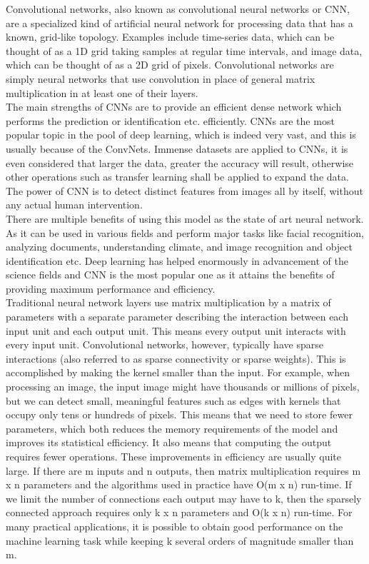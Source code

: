 Convolutional networks, \cite{Deep Learning} also known as convolutional neural networks or CNN, are a specialized kind of artificial neural network for processing data that has a known, grid-like topology. Examples include time-series data, which can be thought of as a 1D grid taking samples at regular time intervals, and image data, which can be thought of as a 2D grid of pixels. Convolutional networks are simply neural networks that use convolution in place of general matrix multiplication in at least one of their layers.\\

The main strengths of CNNs are to provide an efficient dense network which performs the prediction or identification etc. efficiently. CNNs are the most popular topic in the pool of deep learning, which is indeed very vast, and this is usually because of the ConvNets. Immense datasets are applied to CNNs, it is even considered that larger the data, greater the accuracy will result, otherwise other operations such as transfer learning shall be applied to expand the data. The power of CNN is to detect distinct features from images all by itself, without any actual human intervention.\\

There are multiple benefits of using this model as the state of art neural network. As it can be used in various fields and perform major tasks like facial recognition, analyzing documents, understanding climate, and image recognition and object identification etc. Deep learning has helped enormously in advancement of the science fields and CNN is the most popular one as it attains the benefits of providing maximum performance and efficiency.\\

Traditional neural network layers use matrix multiplication by a matrix of
parameters with a separate parameter describing the interaction between each input
unit and each output unit. This means every output unit interacts with every input
unit. Convolutional networks, however, typically have sparse interactions (also
referred to as sparse connectivity or sparse weights). This is accomplished by
making the kernel smaller than the input. For example, when processing an image,
the input image might have thousands or millions of pixels, but we can detect small,
meaningful features such as edges with kernels that occupy only tens or hundreds of
pixels. This means that we need to store fewer parameters, which both reduces the
memory requirements of the model and improves its statistical efficiency. It also
means that computing the output requires fewer operations. These improvements
in efficiency are usually quite large. If there are m inputs and n outputs, then
matrix multiplication requires m x n parameters and the algorithms used in practice
have O(m x n) run-time. If we limit the number of connections
each output may have to k, then the sparsely connected approach requires only
k x n parameters and O(k x n) run-time. For many practical applications, it is
possible to obtain good performance on the machine learning task while keeping
k several orders of magnitude smaller than m. \\


